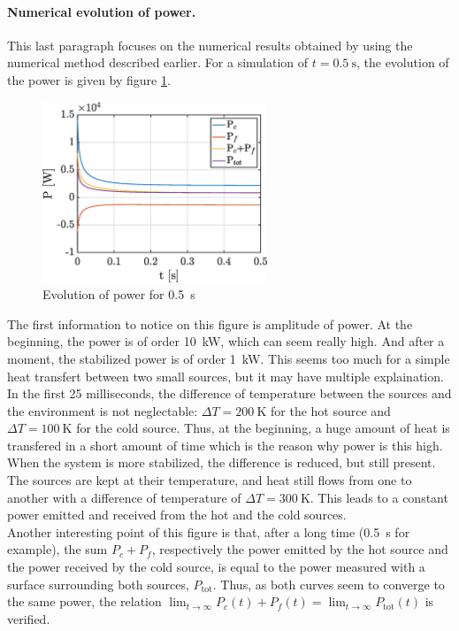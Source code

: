 \documentclass[a4paper,12pt,twoside]{article}
\begin{document}
\paragraph{Numerical evolution of power.}
This last paragraph focuses on the numerical results obtained by using the numerical method described earlier.
For a simulation of $t=\SI{0.5}{\s}$, the evolution of the power is given by figure \ref{fig:d-power}.

\begin{figure}[h]
  \centering
  \includegraphics[width=0.6\textwidth]{graphs/d_power.eps}
  \caption{Evolution of power for \SI{0.5}{\s}}
  \label{fig:d-power}
\end{figure}

The first information to notice on this figure is amplitude of power.
At the beginning, the power is of order \SI{10}{\kilo\watt}, which can seem really high.
And after a moment, the stabilized power is of order \SI{1}{\kilo\watt}.
This seems too much for a simple heat transfert between two small sources, but it may have multiple explaination.
In the first \num{25} milliseconds, the difference of temperature between the sources and the environment is not neglectable: $\Delta T=\SI{200}{\kelvin}$ for the hot source and $\Delta T=\SI{100}{\kelvin}$ for the cold source.
Thus, at the beginning, a huge amount of heat is transfered in a short amount of time which is the reason why power is this high.
When the system is more stabilized, the difference is reduced, but still present.
The sources are kept at their temperature, and heat still flows from one to another with a difference of temperature of $\Delta T=\SI{300}{\kelvin}$.
This leads to a constant power emitted and received from the hot and the cold sources.\\

Another interesting point of this figure is that, after a long time (\SI{0.5}{\second} for example), the sum $P_c + P_f$, respectively the power emitted by the hot source and the power received by the cold source, is equal to the power measured with a surface surrounding both sources, $P_\text{tot}$.
Thus, as both curves seem to converge to the same power, the relation $\lim_{t\rightarrow\infty}P_c(t) + P_f(t) = \lim_{t\rightarrow\infty}P_\text{tot}(t)$ is verified.
\end{document}
